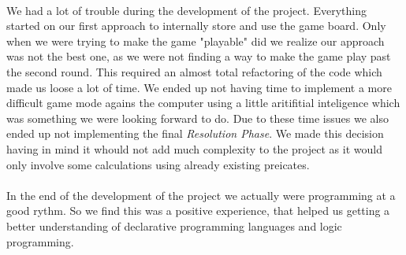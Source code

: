\documentclass[a4paper]{article}
\begin{document}
\paragraph{}
We had a lot of trouble during the development of the project. Everything started on our first
approach to internally store and use the game board. Only when we were trying to make 
the game "playable" did we realize our approach was not the best one, as we were not finding a 
way to make the game play past the second round. This required an almost total refactoring of
the code which made us loose a lot of time. We ended up not having time to implement a more 
difficult game mode agains the computer using a little aritifitial inteligence which was 
something we were looking forward to do. Due to these time issues we also ended up not implementing
the final \textit{Resolution Phase}. We made this decision having in mind it whould not add much
 complexity to the project as it would only involve some calculations using already existing preicates.

\paragraph{}
In the end of the development of the project we actually were programming at a good rythm. So 
we find this was a positive experience, that helped us getting a better understanding 
of declarative programming languages and logic programming.


\clearpage
\renewcommand\refname{Apendix}



\newpage
\appendix
\end{document}
